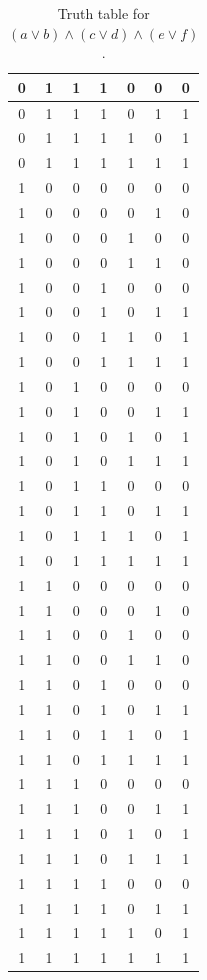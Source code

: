 \begin{table}[!tb]
\begin{tabular}{|c|c|c|c|c|c|c|}
        0 & 1 & 1 & 1 & 0 & 0 & 0 \\ \hline
        0 & 1 & 1 & 1 & 0 & 1 & 1 \\ \hline
        0 & 1 & 1 & 1 & 1 & 0 & 1 \\ \hline
        0 & 1 & 1 & 1 & 1 & 1 & 1 \\ \hline
        1 & 0 & 0 & 0 & 0 & 0 & 0 \\ \hline
        1 & 0 & 0 & 0 & 0 & 1 & 0 \\ \hline
        1 & 0 & 0 & 0 & 1 & 0 & 0 \\ \hline
        1 & 0 & 0 & 0 & 1 & 1 & 0 \\ \hline
        1 & 0 & 0 & 1 & 0 & 0 & 0 \\ \hline
        1 & 0 & 0 & 1 & 0 & 1 & 1 \\ \hline
        1 & 0 & 0 & 1 & 1 & 0 & 1 \\ \hline
        1 & 0 & 0 & 1 & 1 & 1 & 1 \\ \hline
        1 & 0 & 1 & 0 & 0 & 0 & 0 \\ \hline
        1 & 0 & 1 & 0 & 0 & 1 & 1 \\ \hline
        1 & 0 & 1 & 0 & 1 & 0 & 1 \\ \hline
        1 & 0 & 1 & 0 & 1 & 1 & 1 \\ \hline
        1 & 0 & 1 & 1 & 0 & 0 & 0 \\ \hline
        1 & 0 & 1 & 1 & 0 & 1 & 1 \\ \hline
        1 & 0 & 1 & 1 & 1 & 0 & 1 \\ \hline
        1 & 0 & 1 & 1 & 1 & 1 & 1 \\ \hline
        1 & 1 & 0 & 0 & 0 & 0 & 0 \\ \hline
        1 & 1 & 0 & 0 & 0 & 1 & 0 \\ \hline
        1 & 1 & 0 & 0 & 1 & 0 & 0 \\ \hline
        1 & 1 & 0 & 0 & 1 & 1 & 0 \\ \hline
        1 & 1 & 0 & 1 & 0 & 0 & 0 \\ \hline
        1 & 1 & 0 & 1 & 0 & 1 & 1 \\ \hline
        1 & 1 & 0 & 1 & 1 & 0 & 1 \\ \hline
        1 & 1 & 0 & 1 & 1 & 1 & 1 \\ \hline
        1 & 1 & 1 & 0 & 0 & 0 & 0 \\ \hline
        1 & 1 & 1 & 0 & 0 & 1 & 1 \\ \hline
        1 & 1 & 1 & 0 & 1 & 0 & 1 \\ \hline
        1 & 1 & 1 & 0 & 1 & 1 & 1 \\ \hline
        1 & 1 & 1 & 1 & 0 & 0 & 0 \\ \hline
        1 & 1 & 1 & 1 & 0 & 1 & 1 \\ \hline
        1 & 1 & 1 & 1 & 1 & 0 & 1 \\ \hline
        1 & 1 & 1 & 1 & 1 & 1 & 1 \\ \hline
    \end{tabular}
    \caption{Truth table for $(a \lor b) \land (c \lor d) \land (e \lor f)$.}
    \label{tab:truthtab}
\end{table}

